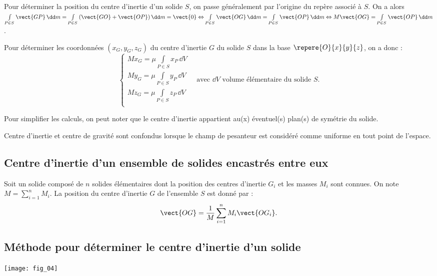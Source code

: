 Pour déterminer la position du centre d'inertie d'un solide $S$, on passe généralement par l'origine du repère associé à $S$. On a alors 
$\int\limits_{P\in S} \vect{GP} \, \dd m=\int\limits_{P\in S} \left(\vect{GO}+\vect{OP}\right) \dd m = \vect{0} 
\Leftrightarrow \int\limits_{P\in S} \vect{OG} \,\dd m =\int\limits_{P\in S} \vect{OP} \,\dd m
\Leftrightarrow  M\vect{OG} =\int\limits_{P\in S} \vect{OP} \,\dd m$.

\begin{methode}
Pour déterminer les coordonnées $\left(x_G,y_G,z_G\right)$ du centre d'inertie $G$ du solide $S$ dans la base $\repere{O}{x}{y}{z}$, on a donc :
$$
\left\{
\begin{array}{l}
M x_G =\mu \int\limits_{P\in S} x_P \,\dd V \\
M y_G =\mu \int\limits_{P\in S} y_P \,\dd V \\
M z_G =\mu \int\limits_{P\in S} z_P \,\dd V \\
\end{array}
\right. \quad \text{avec }\dd V \text{ volume élémentaire du solide $S$.}
$$ 

Pour simplifier les calculs, on peut noter que le centre d'inertie appartient au(x) éventuel(s) plan(s) de symétrie du solide.
\end{methode}
\vspace{-.5cm}
\begin{rem}
Centre d'inertie et centre de gravité sont confondus lorsque le champ de pesanteur est considéré comme uniforme en tout point de l'espace. 
\end{rem}
\vspace{-.5cm}
\subsection{Centre d'inertie d'un ensemble de solides encastrés entre eux}
\begin{methode}
Soit un solide composé de $n$ solides élémentaires dont la position des centres d'inertie $G_i$ et les masses $M_i$ sont connues. On note $M=\sum\limits_{i=1}^{n}M_i$.  La position du centre d'inertie $G$ de l'ensemble $S$ est donné par :
$$\vect{OG}=\dfrac{1}{M}\sum\limits_{i=1}^{n}M_i \vect{OG_i} .$$

\end{methode}


\subsection{Méthode pour déterminer le centre d'inertie d'un solide \cite{2}}
\begin{center}
\texttt{[image: fig\_04]}
\end{center}

